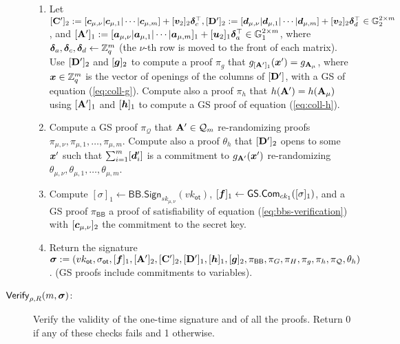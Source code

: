 \begin{description}
\begin{enumerate}
\item Let
$
[\mathbf{{C}}']_2:=[{\boldsymbol{c}}_{\mu,\nu}|{\boldsymbol{c}}_{\mu,1}|\cdots|{\boldsymbol{c}}_{\mu,m}]+[{\boldsymbol{v}}_2]_2{\boldsymbol{\delta}}_c^\top,[\mathbf{{D}}']_2:=[{\boldsymbol{d}}_{\mu,\nu}|{\boldsymbol{d}}_{\mu,1}|\cdots|{\boldsymbol{d}}_{\mu,m}]+[{\boldsymbol{v}}_2]_2{\boldsymbol{\delta}}_d^\top\in\mathbb{G}_2^{2\times m}$, and $[\mathbf{{A}}']_1:=[{\boldsymbol{a}}_{\mu,\nu} | {\boldsymbol{a}}_{\mu,1} | \cdots |{\boldsymbol{a}}_{\mu,m}]_1+[{\boldsymbol{u}}_2]_1{\boldsymbol{\delta}}_a^\top\in\mathbb{G}^{2\times m}_1$, where ${\boldsymbol{\delta}}_a,{\boldsymbol{\delta}}_c,{\boldsymbol{\delta}}_d\gets\mathbb{Z}_q^m$ (the $\nu$-th row is moved to the front of each matrix).
Use $[\mathbf{{D}}']_2$ and $[{\boldsymbol{g}}]_2$ to compute a proof $\pi_g$ that $g_{[\mathbf{{A}}']_1}({\boldsymbol{x}}')=g_{\mathbf{{A}}_\mu}$, where ${\boldsymbol{x}}\in\mathbb{Z}_q^m$ is the vector of openings of the columns of $[\mathbf{{D}}']$,  with a GS of equation (\ref{eq:coll-g}). Compute also a proof $\pi_h$ that $h(\mathbf{{A}}')=h(\mathbf{{A}}_\mu)$ using $[\mathbf{{A}}']_1$ and $[{\boldsymbol{h}}
]_1$ to compute a GS proof of equation (\ref{eq:coll-h}).
\item Compute a GS proof $\pi_{\mathcal{Q}}$ that $\mathbf{{A}}'\in \mathcal{Q}_m$ re-randomizing proofs $\pi_{\mu,\nu},\pi_{\mu,1},\allowbreak\ldots,\pi_{\mu,m}$. Compute also a proof $\theta_h$ that $[\mathbf{{D}}']_2$ opens to some ${\boldsymbol{x}}'$ such that $\sum_{i=1}^m[{\boldsymbol{d}}'_i]$ is a commitment to $g_{\mathbf{{A}}'}({\boldsymbol{x}}')$ re-randomizing $\theta_{\mu,\nu},\theta_{\mu,1},\ldots,\theta_{\mu,m}$.

\item Compute $[\sigma]_1\gets\mathsf{BB}.\mathsf{Sign}_{sk_{\mu,\nu}}(vk_\mathsf{ot})$, $[{\boldsymbol{f}}]_1\gets{\mathsf{GS}}.\mathsf{Com}_{ck_1}([\sigma]_1)$, and a GS proof $\pi_\mathsf{BB}$ a proof of satisfiability of equation (\ref{eq:bbs-verification}) with $[{\boldsymbol{c}}_{\mu,\nu}]_2$ the commitment to the secret key.

\item Return the signature ${\boldsymbol \sigma}:=(vk_\mathsf{ot},\sigma_\mathsf{ot},[{\boldsymbol{f}}]_1,[\mathbf{{A}}']_2,[\mathbf{{C}}']_2,[\mathbf{{D}}']_1,[{\boldsymbol{h}}]_1,[{\boldsymbol{g}}]_2,\pi_{\mathsf{BB}},\allowbreak\pi_G,\pi_H, \pi_g,\pi_h,\pi_{\mathcal{Q}},\theta_h)$. (GS proofs include commitments to variables).
\end{enumerate}

\item[$\mathsf{Verify}_{\rho,R}(m,{\boldsymbol \sigma})$:] Verify the validity of the one-time signature and of all the proofs. Return 0 if any of these checks fails and 1 otherwise.
\end{description}


